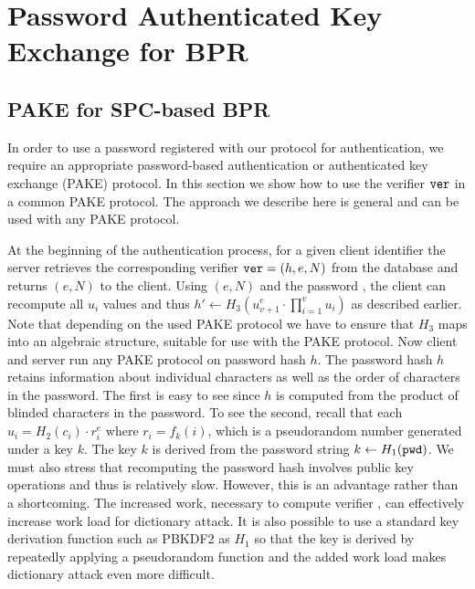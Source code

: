 










\section{Password Authenticated Key Exchange for BPR}\label{sec:pake}
\subsection{PAKE for SPC-based BPR}
In order to use a password registered with our protocol for authentication, we require an appropriate password-based authentication or authenticated key exchange (PAKE) protocol.
In this section we show how to use the verifier $\mathtt{ver}$ in a common PAKE protocol. The approach we describe here is general and can be used with any PAKE protocol.

At the beginning of the authentication process, for a given client identifier the server retrieves the corresponding verifier $\mathtt{ver}=(h, e, N)$ from the database and returns $(e,N)$ to the client.
Using $(e,N)$ and the password \pwd, the client can recompute all $u_i$ values and thus $h'\gets H_3(u_{v+1}^e\cdot\prod_{i=1}^{v}u_i)$ as described earlier.
Note that depending on the used PAKE protocol we have to ensure that $H_3$ maps into an algebraic structure, suitable for use with the PAKE protocol.
Now client and server run any PAKE protocol on password hash $h$. The password hash $h$ retains information about individual characters as well as the order of characters in the password. The first is easy to see since $h$ is computed from the product of blinded characters in the password.  
To see the second, recall that each $u_i=H_2(c_i)\cdot r_i^e$ where $r_i=f_k(i)$, which is a pseudorandom number generated under a key $k$. 
The key $k$ is derived from the password string $k\gets H_1(\mathtt{pwd})$. 
We must also stress that recomputing the password hash involves public key operations and thus is relatively slow.
However, this is an advantage rather than a shortcoming. 
The increased work, necessary to compute verifier \ver, can effectively increase work load for dictionary attack. 
It is also possible to use a standard key derivation function such as PBKDF2 \cite{rfc2898} as $H_1$ so that the key is derived by repeatedly applying a pseudorandom function and the added work load makes dictionary attack even more difficult.


